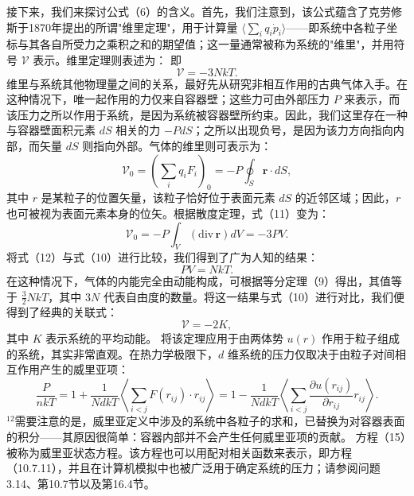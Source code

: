 接下来，我们来探讨公式（6）的含义。首先，我们注意到，该公式蕴含了克劳修斯于1870年提出的所谓"维里定理"，用于计算量 \(\langle\sum_{i}q_{i}\dot{p}_{i}\rangle\)——即系统中各粒子坐标与其各自所受力之乘积之和的期望值；这一量通常被称为系统的"维里"，并用符号 \(\mathcal{V}\) 表示。维里定理则表述为：
即
\begin{equation}\tag{3.5.46}\label{eq:3.5.46}
\mathcal { V } = - 3 N k T .
\end{equation}
维里与系统其他物理量之间的关系，最好先从研究非相互作用的古典气体入手。在这种情况下，唯一起作用的力仅来自容器壁；这些力可由外部压力 \(P\) 来表示，而该压力之所以作用于系统，是因为系统被容器壁所约束。因此，我们这里存在一种与容器壁面积元素 \(dS\) 相关的力 \(-PdS\)；之所以出现负号，是因为该力方向指向内部，而矢量 \(dS\) 则指向外部。气体的维里则可表示为：
\begin{equation}\tag{3.5.47}\label{eq:3.5.47}
\pmb { \mathcal { V } } _ { 0 } = \left( \sum _ { i } q _ { i } F _ { i } \right) _ { 0 } = - P \oint _ { S } \pmb { r } \cdot d S ,
\end{equation}
其中 \(r\) 是某粒子的位置矢量，该粒子恰好位于表面元素 \(dS\) 的近邻区域；因此，\(r\) 也可被视为表面元素本身的位矢。根据散度定理，式（11）变为：
\begin{equation}\tag{3.5.48}\label{eq:3.5.48}
\mathcal { V } _ { 0 } = - P \int _ { V } ( \mathrm { d i v } \, \mathbf { r } ) d V = - 3 P V .
\end{equation}
将式（12）与式（10）进行比较，我们得到了广为人知的结果：
\begin{equation}\tag{3.5.49}\label{eq:3.5.49}
P V = N k T .
\end{equation}
在这种情况下，气体的内能完全由动能构成，可根据等分定理（9）得出，其值等于 \(\frac{3}{2}NkT\)，其中 \(3N\) 代表自由度的数量。将这一结果与式（10）进行对比，我们便得到了经典的关联式：
\begin{equation}\tag{3.5.50}\label{eq:3.5.50}
\mathcal { V } = - 2 K ,
\end{equation}
其中 \(K\) 表示系统的平均动能。
将该定理应用于由两体势 \(u(r)\) 作用于粒子组成的系统，其实非常直观。在热力学极限下，\(d\) 维系统的压力仅取决于由粒子对间相互作用产生的威里亚项：
\begin{equation}\tag{3.5.51}\label{eq:3.5.51}
\frac { P } { n k T } = 1 + \frac { 1 } { N d k T } \left\langle \sum _ { i < j } F ( r _ { i j } ) \cdot r _ { i j } \right\rangle = 1 - \frac { 1 } { N d k T } \left\langle \sum _ { i < j } \frac { \partial u ( r _ { i j } ) } { \partial r _ { i j } } r _ { i j } \right\rangle .
\end{equation}
\(^{12}\)需要注意的是，威里亚定义中涉及的系统中各粒子的求和，已替换为对容器表面的积分——其原因很简单：容器内部并不会产生任何威里亚项的贡献。
方程（15）被称为威里亚状态方程。该方程也可以用配对相关函数来表示，即方程（10.7.11），并且在计算机模拟中也被广泛用于确定系统的压力；请参阅问题3.14、第10.7节以及第16.4节。
